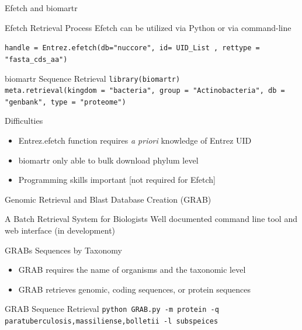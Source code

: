 \documentclass[11pt]{beamer}
\begin{document}
	
	
	\begin{frame}{Efetch and biomartr}
	
	\begin{block}{Efetch Retrieval Process}
	Efetch can be utilized via Python or via command-line
	
	\texttt{handle = Entrez.efetch(db="nuccore", id= \alert{UID\_List} , rettype = "fasta\_cds\_aa")}
	
	\end{block}
	
	\begin{block}{biomartr Sequence Retrieval}
	\texttt{library(biomartr) \\
	meta.retrieval(kingdom = "bacteria", \alert{group = "Actinobacteria"}, db = "genbank", type = "proteome")}
	\end{block}
	
	\begin{block}{Difficulties}
	\begin{itemize}
	\item Entrez.efetch function requires \textit{a priori} knowledge of Entrez UID 
	\item biomartr only able to bulk download phylum level
	\item Programming skills important [not required for Efetch]
	\end{itemize}
	\end{block}
	
	\end{frame}
	
	
	\begin{frame}{Genomic Retrieval and Blast Database Creation (GRAB)}
	\begin{block}{A Batch Retrieval System for Biologists}
	Well documented command line tool and web interface (in development)
	\end{block}
	
	\begin{block}{GRABs Sequences by Taxonomy}
	\begin{itemize}
	\item GRAB requires the name of organisms and the taxonomic level 
	\item GRAB retrieves genomic, coding sequences, or protein sequences
	\end{itemize}
	\end{block}
	
	\begin{block}{GRAB Sequence Retrieval}
	\texttt{python GRAB.py -m protein -q paratuberculosis,massiliense,bolletii -l subspeices}
	\end{block}
	\end{frame}
		
\end{document}
